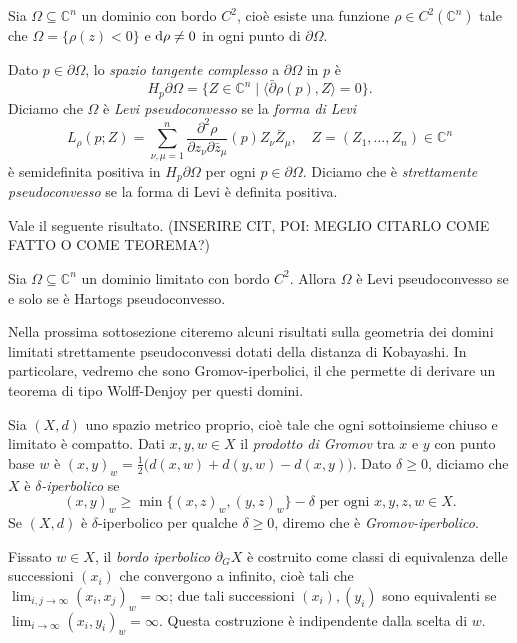 \begin{defn}
    Sia $\Omega \subseteq \mathbb{C}^n$ un dominio con bordo $C^2$, cioè esiste una funzione $\rho \in C^2(\mathbb{C}^n)$ tale che $\Omega=\{\rho(z)<0\}$ e $\mathop{}\!\mathrm{d}\rho\not=0$ in ogni punto di $\partial\Omega$.
    
    Dato $p \in \partial\Omega$, lo \textit{spazio tangente complesso} a $\partial\Omega$ in $p$ è
    \begin{equation}
        H_p\partial\Omega=\{Z \in \mathbb{C}^n \mid \langle \bar{\partial}\rho(p),Z\rangle=0\}.
    \end{equation}
    Diciamo che $\Omega$ è \textit{Levi pseudoconvesso} se la \textit{forma di Levi}
    \begin{equation}
        L_{\rho}(p;Z)=\sum_{\nu,\mu=1}^n \frac{\partial^2\rho}{\partial z_\nu\partial\bar{z}_\mu}(p)Z_\nu\bar{Z}_\mu, \quad Z=(Z_1,\dots,Z_n) \in \mathbb{C}^n
    \end{equation}
      è semidefinita positiva in $H_p\partial\Omega$ per ogni $p \in \partial\Omega$. Diciamo che è \textit{strettamente pseudoconvesso} se la forma di Levi è definita positiva.
\end{defn}

Vale il seguente risultato. (INSERIRE CIT, POI: MEGLIO CITARLO COME FATTO O COME TEOREMA?)
\begin{ftt}
    Sia $\Omega \subseteq \mathbb{C}^n$ un dominio limitato con bordo $C^2$. Allora $\Omega$ è Levi pseudoconvesso se e solo se è Hartogs pseudoconvesso.
\end{ftt}

Nella prossima sottosezione citeremo alcuni risultati sulla geometria dei domini limitati strettamente pseudoconvessi dotati della distanza di Kobayashi. In particolare, vedremo che sono Gromov-iperbolici, il che permette di derivare un teorema di tipo Wolff-Denjoy per questi domini.

\begin{defn}
    Sia $(X,d)$ uno spazio metrico proprio, cioè tale che ogni sottoinsieme chiuso e limitato è compatto. Dati $x,y,w \in X$ il \textit{prodotto di Gromov} tra $x$ e $y$ con punto base $w$ è $(x,y)_w=\frac{1}{2}\big(d(x,w)+d(y,w)-d(x,y)\big)$. Dato $\delta \ge 0$, diciamo che $X$ è \textit{$\delta$-iperbolico} se
    $$(x,y)_w \ge \min\{(x,z)_w,(y,z)_w\}-\delta\text{ per ogni }x,y,z,w \in X.$$
    Se $(X,d)$ è $\delta$-iperbolico per qualche $\delta \ge 0$, diremo che è \textit{Gromov-iperbolico}.

    Fissato $w \in X$, il \textit{bordo iperbolico} $\partial_GX$ è costruito come classi di equivalenza delle successioni $(x_i)$ che convergono a infinito, cioè tali che $\displaystyle\lim_{i,j\rightarrow \infty}(x_i,x_j)_w=\infty$; due tali successioni $(x_i), (y_i)$ sono equivalenti se $\displaystyle\lim_{i\rightarrow \infty}(x_i,y_i)_w=\infty$. Questa costruzione è indipendente dalla scelta di $w$.
\end{defn}

